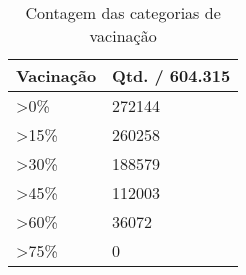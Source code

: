 \begin{table}[H] 
  \centering
  \centering
  \begin{tabular}{ll}
  \hline
  \multicolumn{1}{|l|}{\textbf{Vacinação}} & \multicolumn{1}{l|}{\textbf{Qtd. / 604.315}} \\ \hline
  \textgreater 0\%                            & 272144                                   \\
  \textgreater 15\%                           & 260258                                   \\
  \textgreater 30\%                           & 188579                                   \\
  \textgreater 45\%                           & 112003                                   \\
  \textgreater 60\%                           & 36072                                    \\
  \textgreater 75\%                           & 0                                       
  \end{tabular}
  \caption{Contagem das categorias de vacinação}
  \label{tbl:tabela-categoria-vacinacao} 
  \end{table}